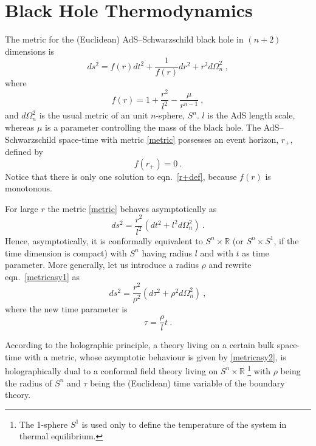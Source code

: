 \documentclass[a4paper,12pt]{article}
\begin{document}
\section{Black Hole Thermodynamics}
\label{entropy}
The metric for the (Euclidean) AdS--Schwarzschild black hole in
$(n+2)$ dimensions is
\begin{equation}
\label{metric}
  ds^2 = f(r) dt^2 + \frac1{f(r)} dr^2 +r^2 d\Omega_n^2~,
\end{equation}
where
\begin{equation}
\label{fdef}
  f(r) = 1+\frac{r^2}{l^2} -\frac{\mu}{r^{n-1}}~,
\end{equation}
and $d\Omega_n^2$ is the usual metric of an unit $n$-sphere, $S^n$.
$l$ is the AdS length scale, whereas $\mu$ is a parameter
controlling the mass of the black hole. The AdS--Schwarzschild
space-time with metric \eqref{metric} possesses an event horizon,
$r_+$, defined by
\begin{equation}
\label{r+def}
  f(r_+)=0~.
\end{equation}
Notice that there is only one solution to eqn.\ \eqref{r+def}, because
$f(r)$ is monotonous.

For large $r$ the metric \eqref{metric} behaves asymptotically as
\begin{equation}
\label{metricasy1}
  ds^2 = \frac{r^2}{l^2} \left( dt^2 + l^2 d\Omega_n^2 \right)~.
\end{equation}
Hence, asymptotically, it is conformally equivalent to $S^n{\times}
\mathbb{R}$ (or $S^n {\times} S^1$, if the time dimension is compact)
with $S^n$ having radius $l$ and with $t$ as time parameter. More generally,
let us introduce a radius $\rho$ and rewrite eqn.\
\eqref{metricasy1} as
\begin{equation}
\label{metricasy2}
  ds^2 = \frac{r^2}{\rho^2} \left( d\tau^2 + \rho^2 d\Omega_n^2
  \right)~,
\end{equation}
where the new time parameter is
\begin{equation}
\label{taudef}
  \tau = \frac{\rho}l t~.
\end{equation}

According to the holographic principle, a theory living on a certain
bulk space-time with a metric, whose asymptotic behaviour is given by
\eqref{metricasy2}, is holographically dual to a conformal field
theory living on $S^n{\times} \mathbb{R}$ \footnote{The 1-sphere $S^1$ is used
only to define the temperature of the system in thermal
equilibrium.} with $\rho$ being the radius of $S^n$ and $\tau$ being
the (Euclidean) time variable of the boundary theory.
\end{document}

